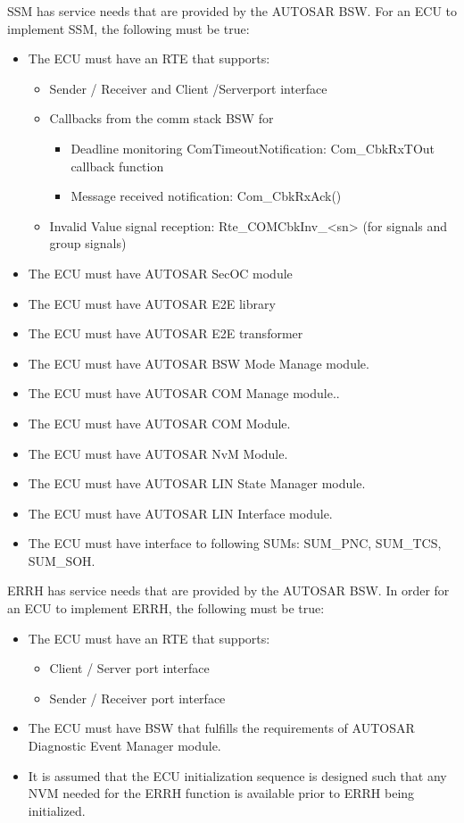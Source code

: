 SSM has service needs that are provided by the AUTOSAR BSW. For an ECU to implement SSM, the following must be true:
\begin{itemize}
\item The ECU must have an RTE that supports:
	\begin{itemize}
	\item Sender / Receiver and Client /Serverport interface
	\item Callbacks from the comm stack BSW for
		\begin{itemize}
		\item Deadline monitoring ComTimeoutNotification: Com\_CbkRxTOut callback function
		\item Message received notification: Com\_CbkRxAck()
		\end{itemize}
	\item Invalid Value signal reception: Rte\_COMCbkInv\_<sn> (for signals and group signals)
	\end{itemize}
\item The ECU must have AUTOSAR SecOC module
\item The ECU must have AUTOSAR E2E library
\item The ECU must have AUTOSAR E2E transformer
\item The ECU must have AUTOSAR BSW Mode Manage module.
\item The ECU must have AUTOSAR COM Manage module..
\item The ECU must have AUTOSAR COM Module.
\item The ECU must have AUTOSAR NvM Module.
\item The ECU must have AUTOSAR LIN State Manager module.
\item The ECU must have AUTOSAR LIN Interface module.
\item The ECU must have interface to following SUMs: SUM\_PNC, SUM\_TCS, SUM\_SOH.
\end{itemize}

ERRH has service needs that are provided by the AUTOSAR BSW. In order for an ECU to implement ERRH, the following must be true:
\begin{itemize}
\item The ECU must have an RTE that supports:
	\begin{itemize}
	\item Client / Server port interface
	\item Sender / Receiver port interface
	\end{itemize}
\item The ECU must have BSW that fulfills the requirements of AUTOSAR Diagnostic Event Manager module.
\item It is assumed that the ECU initialization sequence is designed such that any NVM needed for the ERRH function is available prior to ERRH being initialized.
\end{itemize}

